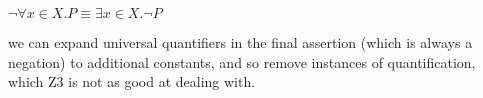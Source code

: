 \begin{center}
    $\lnot \forall x \in X . P \equiv \exists x \in X . \lnot P$
\end{center}

we can expand universal quantifiers in the final assertion (which is always a negation) to additional
constants, and so remove instances of quantification, which Z3 is not as good at dealing with.
